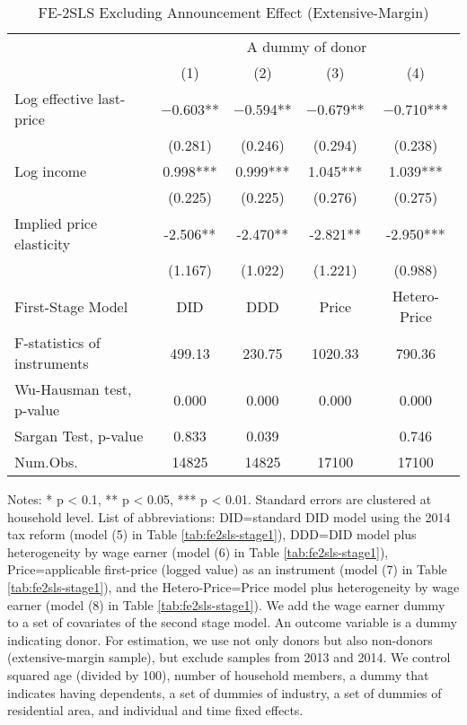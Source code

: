 \begin{table}

\caption{FE-2SLS Excluding Announcement Effect (Extensive-Margin)\label{tab:fe2sls-announce-ext}}
\centering
\fontsize{8}{10}\selectfont
\begin{threeparttable}
\begin{tabular}[t]{lcccc}
\toprule
\multicolumn{1}{c}{ } & \multicolumn{4}{c}{A dummy of donor} \\
\cmidrule(l{3pt}r{3pt}){2-5}
  & (1) & (2) & (3) & (4)\\
\midrule
Log effective last-price & \num{-0.603}** & \num{-0.594}** & \num{-0.679}** & \num{-0.710}***\\
 & (\num{0.281}) & (\num{0.246}) & (\num{0.294}) & (\num{0.238})\\
Log income & \num{0.998}*** & \num{0.999}*** & \num{1.045}*** & \num{1.039}***\\
 & (\num{0.225}) & (\num{0.225}) & (\num{0.276}) & (\num{0.275})\\
\midrule
Implied price elasticity & -2.506** & -2.470** & -2.821** & -2.950***\\
 & (1.167) & (1.022) & (1.221) & (0.988)\\
First-Stage Model & DID & DDD & Price & Hetero-Price\\
F-statistics of instruments & 499.13 & 230.75 & 1020.33 & 790.36\\
Wu-Hausman test, p-value & 0.000 & 0.000 & 0.000 & 0.000\\
Sargan Test, p-value & 0.833 & 0.039 &  & 0.746\\
Num.Obs. & \num{14825} & \num{14825} & \num{17100} & \num{17100}\\
\bottomrule
\end{tabular}
\begin{tablenotes}
\item Notes: * p < 0.1, ** p < 0.05, *** p < 0.01. Standard errors are clustered at household level. List of abbreviations: DID=standard DID model using the 2014 tax reform (model (5) in Table \ref{tab:fe2sls-stage1}), DDD=DID model plus heterogeneity by wage earner (model (6) in Table \ref{tab:fe2sls-stage1}), Price=applicable first-price (logged value) as an instrument (model (7) in Table \ref{tab:fe2sls-stage1}), and the Hetero-Price=Price model plus heterogeneity by wage earner (model (8) in Table \ref{tab:fe2sls-stage1}). We add the wage earner dummy to a set of covariates of the second stage model. An outcome variable is a dummy indicating donor. For estimation, we use not only donors but also non-donors (extensive-margin sample), but exclude samples from 2013 and 2014. We control squared age (divided by 100), number of household members, a dummy that indicates having dependents, a set of dummies of industry, a set of dummies of residential area, and individual and time fixed effects.
\end{tablenotes}
\end{threeparttable}
\end{table}

